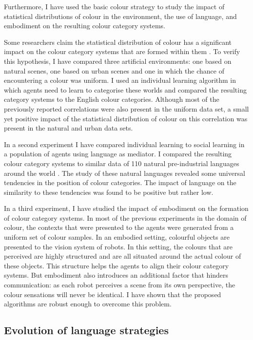 Furthermore, I have used the basic colour strategy to study the
impact of statistical distributions of colour in the environment, the
use of language, and embodiment on the resulting colour category
systems.

Some researchers claim the statistical distribution of colour has a
significant impact on the colour category systems that are formed
within them \citep{yendrikhovskij01computational}. To verify this
hypothesis, I have compared three artificial environments: one based
on natural scenes, one based on urban scenes and one in which the
chance of encountering a colour was uniform. I used an individual
learning algorithm in which agents need to learn to categorise these
worlds and compared the resulting category systems to the English
colour categories. Although most of the previously reported
correlations were also present in the uniform data set, a small yet
positive impact of the statistical distribution of colour on this
correlation was present in the natural and urban data sets.

In a second experiment I have compared individual learning to social
learning in a population of agents using language as mediator. I
compared the resulting colour category systems to similar data of 110
natural pre-industrial languages around the world
\citep{kay10world}. The study of these natural languages revealed
some universal tendencies in the position of colour categories. The
impact of language on the similarity to these tendencies was found to
be positive but rather low.

In a third experiment, I have studied the impact of embodiment on the
formation of colour category systems. In most of the previous
experiments in the domain of colour, the contexts that were presented
to the agents were generated from a uniform set of colour samples. In
an embodied setting, colourful objects are presented to the vision
system of robots. In this setting, the colours that are perceived are
highly structured and are all situated around the actual colour of
these objects. This structure helps the agents to align
their colour category systems. But embodiment also introduces an
additional factor that hinders communication: as each robot perceives
a scene from its own perspective, the colour sensations will never be
identical. I have shown that the proposed algorithms are robust enough
to overcome this problem.

\subsection{Evolution of language strategies}

